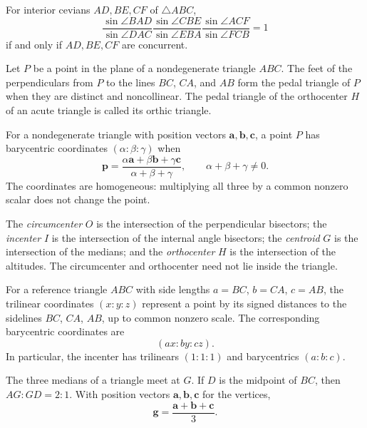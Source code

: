 \begin{theorem}
For interior cevians $AD, BE, CF$ of $\triangle ABC$,
\[
 \frac{\sin\angle BAD}{\sin\angle DAC}
 \frac{\sin\angle CBE}{\sin\angle EBA}
 \frac{\sin\angle ACF}{\sin\angle FCB}=1
\]
if and only if $AD, BE, CF$ are concurrent.
\end{theorem}

\begin{definition}
Let $P$ be a point in the plane of a nondegenerate triangle $ABC$. The feet of the perpendiculars from $P$ to the lines $BC$, $CA$, and $AB$ form the pedal triangle of $P$ when they are distinct and noncollinear. The pedal triangle of the orthocenter $H$ of an acute triangle is called its orthic triangle.
\end{definition}

\begin{definition}
For a nondegenerate triangle with position vectors $\mathbf{a}, \mathbf{b}, \mathbf{c}$, a point $P$ has barycentric coordinates $(\alpha:\beta:\gamma)$ when
\[
 \mathbf{p}=\frac{\alpha\mathbf{a}+\beta\mathbf{b}+\gamma\mathbf{c}}{\alpha+\beta+\gamma},
 \qquad \alpha+\beta+\gamma\ne0.
\]
The coordinates are homogeneous: multiplying all three by a common nonzero scalar does not change the point.
\end{definition}


\begin{definition}
The \emph{circumcenter} $O$ is the intersection of the perpendicular bisectors; the \emph{incenter} $I$ is the intersection of the internal angle bisectors; the \emph{centroid} $G$ is the intersection of the medians; and the \emph{orthocenter} $H$ is the intersection of the altitudes. The circumcenter and orthocenter need not lie inside the triangle.
\end{definition}

\begin{definition}
For a reference triangle $ABC$ with side lengths $a=BC$, $b=CA$, $c=AB$, the trilinear coordinates $(x:y:z)$ represent a point by its signed distances to the sidelines $BC$, $CA$, $AB$, up to common nonzero scale. The corresponding barycentric coordinates are
\[
 (ax:by:cz).
\]
In particular, the incenter has trilinears $(1:1:1)$ and barycentrics $(a:b:c)$.
\end{definition}

\begin{theorem}
The three medians of a triangle meet at $G$. If $D$ is the midpoint of $BC$, then $AG:GD=2:1$. With position vectors $\mathbf{a}, \mathbf{b}, \mathbf{c}$ for the vertices,
\[
 \mathbf{g}=\frac{\mathbf{a}+\mathbf{b}+\mathbf{c}}{3}.
\]
\end{theorem}


